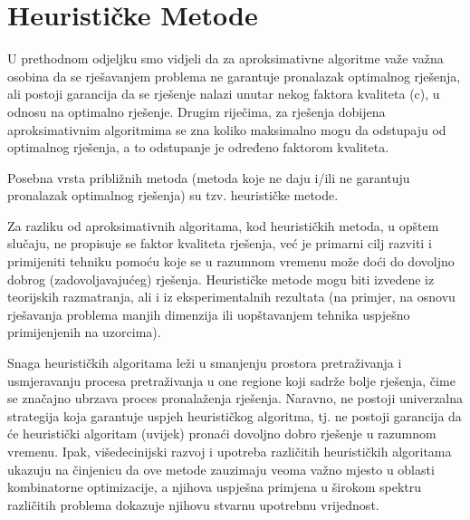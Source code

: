 \documentclass[a4paper, utf8, 11pt, colorlinks]{book}
\begin{document}

  
\section{Heurističke Metode}
 U prethodnom odjeljku smo vidjeli da za aproksimativne algoritme važe važna osobina da se rješavanjem problema ne garantuje pronalazak optimalnog rješenja, ali postoji garancija da se rješenje nalazi unutar nekog faktora kvaliteta (c), u odnosu na optimalno rješenje. 
 Drugim riječima, za rješenja dobijena aproksimativnim algoritmima se zna koliko maksimalno mogu da odstupaju od optimalnog rješenja, a to odstupanje je određeno faktorom kvaliteta.
 
 Posebna vrsta približnih metoda (metoda koje ne daju i/ili ne garantuju pronalazak optimalnog rješenja) su tzv. heurističke metode. 
 
 Za razliku od aproksimativnih algoritama, kod heurističkih metoda, u opštem slučaju, ne propisuje se faktor kvaliteta rješenja, već je primarni cilj razviti i primijeniti tehniku pomoću koje se u razumnom vremenu može doći do dovoljno dobrog (zadovoljavajućeg) rješenja. Heurističke metode mogu biti izvedene iz teorijskih razmatranja, ali i iz eksperimentalnih rezultata (na primjer, na osnovu rješavanja problema manjih dimenzija ili uopštavanjem tehnika uspješno primijenjenih na uzorcima). 
 
 
 Snaga heurističkih algoritama leži u smanjenju prostora pretraživanja i usmjeravanju procesa pretraživanja u one regione koji sadrže bolje rješenja, čime se značajno ubrzava proces pronalaženja rješenja. Naravno, ne postoji univerzalna strategija koja garantuje uspjeh heurističkog algoritma, tj. ne postoji garancija da će heuristički algoritam (uvijek) pronaći dovoljno dobro rješenje u razumnom vremenu. Ipak, višedecinijski razvoj i upotreba različitih heurističkih algoritama ukazuju na činjenicu da ove metode zauzimaju veoma važno mjesto u oblasti kombinatorne optimizacije, a njihova uspješna primjena u širokom spektru različitih problema dokazuje njihovu stvarnu upotrebnu vrijednost.
 
\end{document}
